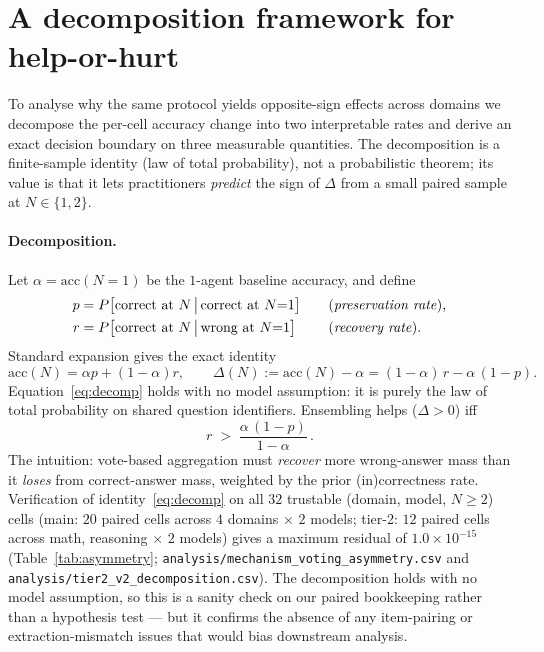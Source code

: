 \documentclass{article}
\begin{document}
\section{A decomposition framework for help-or-hurt}
\label{sec:mechanism}

To analyse why the same protocol yields opposite-sign effects across domains we decompose the per-cell accuracy change into two interpretable rates and derive an exact decision boundary on three measurable quantities. The decomposition is a finite-sample identity (law of total probability), not a probabilistic theorem; its value is that it lets practitioners \emph{predict} the sign of $\Delta$ from a small paired sample at $N{\in}\{1,2\}$.

\paragraph{Decomposition.} Let $\alpha = \mathrm{acc}(N{=}1)$ be the $1$-agent baseline accuracy, and define
\begin{align*}
  p &= P\bigl[\text{correct at }N \,\big|\, \text{correct at }N{=}1\bigr] \quad &&\text{(\emph{preservation rate}),}\\
  r &= P\bigl[\text{correct at }N \,\big|\, \text{wrong at }N{=}1\bigr]   \quad &&\text{(\emph{recovery rate}).}
\end{align*}
Standard expansion gives the exact identity
\begin{equation}
  \mathrm{acc}(N) = \alpha p + (1-\alpha) r,
  \qquad \Delta(N) := \mathrm{acc}(N) - \alpha = (1-\alpha)\, r - \alpha\,(1-p).
  \label{eq:decomp}
\end{equation}
Equation~\eqref{eq:decomp} holds with no model assumption: it is purely the law of total probability on shared question identifiers. Ensembling helps ($\Delta > 0$) iff
\begin{equation}
  r \;>\; \frac{\alpha\,(1-p)}{1-\alpha}\,.
  \label{eq:boundary}
\end{equation}
The intuition: vote-based aggregation must \emph{recover} more wrong-answer mass than it \emph{loses} from correct-answer mass, weighted by the prior (in)correctness rate. Verification of identity~\eqref{eq:decomp} on all $32$ trustable (domain, model, $N{\geq}2$) cells (main: $20$ paired cells across $4$ domains $\times$ $2$ models; tier-2: $12$ paired cells across math, reasoning $\times$ $2$ models) gives a maximum residual of $1.0\times10^{-15}$ (Table~\ref{tab:asymmetry}; \texttt{analysis/mechanism\_voting\_asymmetry.csv} and \texttt{analysis/tier2\_v2\_decomposition.csv}). The decomposition holds with no model assumption, so this is a sanity check on our paired bookkeeping rather than a hypothesis test --- but it confirms the absence of any item-pairing or extraction-mismatch issues that would bias downstream analysis.
\end{document}
